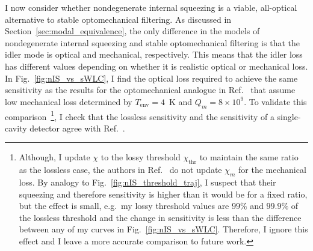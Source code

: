 I now consider whether nondegenerate internal squeezing is a viable, all-optical alternative to stable optomechanical filtering.
As discussed in Section~\ref{sec:modal_equivalence}, the only difference in the models of nondegenerate internal squeezing and stable optomechanical filtering is that the idler mode is optical and mechanical, respectively. This means that the idler loss has different values depending on whether it is realistic optical or mechanical loss. %
In Fig.~\ref{fig:nIS_vs_sWLC}, I find the optical loss required to achieve the same sensitivity as the results for the optomechanical analogue in Ref.~\cite{liBroadbandSensitivityImprovement2020} that assume low mechanical loss determined by $T_\text{env}=4$~K and $Q_m=8\times10^9$. %
To validate this comparison~\footnote{Although, I update $\chi$ to the lossy threshold $\chi_\text{thr}$ to maintain the same ratio as the lossless case, the authors in Ref.~\cite{liBroadbandSensitivityImprovement2020} do not update $\chi_m$ for the mechanical loss. By analogy to Fig.~\ref{fig:nIS_threshold_traj}, I suspect that their squeezing and therefore sensitivity is higher than it would be for a fixed ratio, but the effect is small, e.g.\ my lossy threshold values are $99\%$ and $99.9\%$ of the lossless threshold and the change in sensitivity is less than the difference between any of my curves in Fig.~\ref{fig:nIS_vs_sWLC}. Therefore, I ignore this effect and I leave a more accurate comparison to future work.}, I check that the lossless sensitivity and the sensitivity of a single-cavity detector agree with Ref.~\cite{liBroadbandSensitivityImprovement2020}. %
